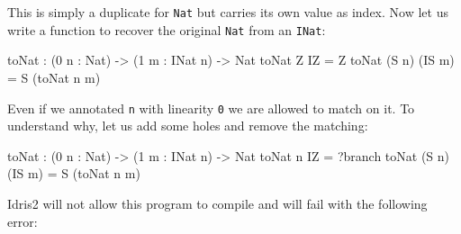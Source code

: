 \documentclass[
]{article}
\newenvironment{Shaded}{}{}
\newcommand{\DataTypeTok}[1]{\textcolor[rgb]{0.56,0.13,0.00}{#1}}
\newcommand{\DecValTok}[1]{\textcolor[rgb]{0.25,0.63,0.44}{#1}}
\newcommand{\NormalTok}[1]{#1}
\newcommand{\OperatorTok}[1]{\textcolor[rgb]{0.40,0.40,0.40}{#1}}
\newcommand{\OtherTok}[1]{\textcolor[rgb]{0.00,0.44,0.13}{#1}}
\begin{document}
This is simply a duplicate for \texttt{Nat} but carries its own value as
index. Now let us write a function to recover the original \texttt{Nat}
from an \texttt{INat}:

\begin{Shaded}
\begin{Highlighting}[]
\NormalTok{toNat }\OperatorTok{:}\NormalTok{ (}\DecValTok{0}\NormalTok{ n }\OperatorTok{:} \DataTypeTok{Nat}\NormalTok{) }\OtherTok{{-}\textgreater{}}\NormalTok{ (}\DecValTok{1}\NormalTok{ m }\OperatorTok{:} \DataTypeTok{INat}\NormalTok{ n) }\OtherTok{{-}\textgreater{}} \DataTypeTok{Nat}
\NormalTok{toNat }\DataTypeTok{Z} \DataTypeTok{IZ} \OtherTok{=} \DataTypeTok{Z}
\NormalTok{toNat (}\DataTypeTok{S}\NormalTok{ n) (}\DataTypeTok{IS}\NormalTok{ m) }\OtherTok{=} \DataTypeTok{S}\NormalTok{ (toNat n m)}
\end{Highlighting}
\end{Shaded}

Even if we annotated \texttt{n} with linearity \texttt{0} we are allowed
to match on it. To understand why, let us add some holes and remove the
matching:

\begin{Shaded}
\begin{Highlighting}[]
\NormalTok{toNat }\OperatorTok{:}\NormalTok{ (}\DecValTok{0}\NormalTok{ n }\OperatorTok{:} \DataTypeTok{Nat}\NormalTok{) }\OtherTok{{-}\textgreater{}}\NormalTok{ (}\DecValTok{1}\NormalTok{ m }\OperatorTok{:} \DataTypeTok{INat}\NormalTok{ n) }\OtherTok{{-}\textgreater{}} \DataTypeTok{Nat}
\NormalTok{toNat n }\DataTypeTok{IZ} \OtherTok{=} \OperatorTok{?}\NormalTok{branch}
\NormalTok{toNat (}\DataTypeTok{S}\NormalTok{ n) (}\DataTypeTok{IS}\NormalTok{ m) }\OtherTok{=} \DataTypeTok{S}\NormalTok{ (toNat n m)}
\end{Highlighting}
\end{Shaded}

Idris2 will not allow this program to compile and will fail with the
following error:
\end{document}
